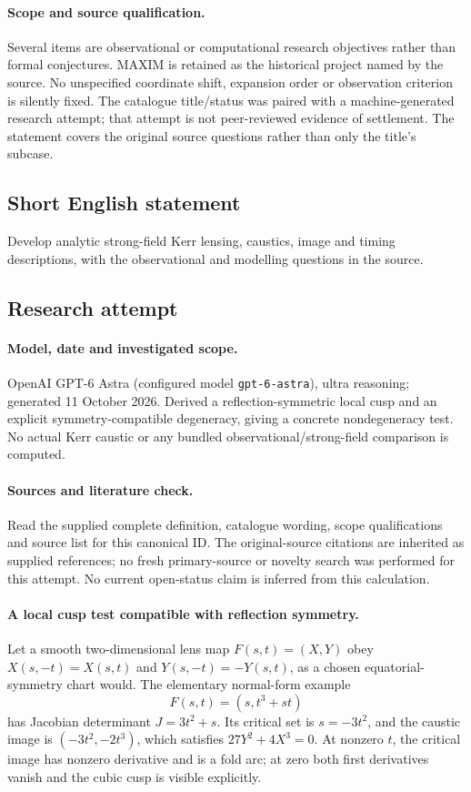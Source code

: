 \documentclass[11pt]{article}
\begin{document}
\paragraph{Scope and source qualification.}Several items are observational or computational research objectives rather than formal conjectures. MAXIM is retained as the historical project named by the source. No unspecified coordinate shift, expansion order or observation criterion is silently fixed. The catalogue title/status was paired with a machine-generated research attempt; that attempt is not peer-reviewed evidence of settlement. The statement covers the original source questions rather than only the title’s subcase.
\subsection{Short English statement}
Develop analytic strong-field Kerr lensing, caustics, image and timing descriptions, with the observational and modelling questions in the source.
\subsection{Research attempt}
\paragraph{Model, date and investigated scope.}
OpenAI GPT-6 Astra (configured model \texttt{gpt-6-astra}), ultra reasoning; generated 11 October 2026. Derived a reflection-symmetric local cusp and an explicit symmetry-compatible degeneracy, giving a concrete nondegeneracy test. No actual Kerr caustic or any bundled observational/strong-field comparison is computed.

\paragraph{Sources and literature check.}
Read the supplied complete definition, catalogue wording, scope qualifications and source list for this canonical ID. The original-source citations are inherited as supplied references; no fresh primary-source or novelty search was performed for this attempt. No current open-status claim is inferred from this calculation.

\paragraph{A local cusp test compatible with reflection symmetry.}Let a smooth two-dimensional lens map \(F(s,t)=(X,Y)\) obey \(X(s,-t)=X(s,t)\) and \(Y(s,-t)=-Y(s,t)\), as a chosen equatorial-symmetry chart would. The elementary normal-form example
\[F(s,t)=(s,t^3+st)
\]
has Jacobian determinant \(J=3t^2+s\). Its critical set is \(s=-3t^2\), and the caustic image is \((-3t^2,-2t^3)\), which satisfies \(27Y^2+4X^3=0\). At nonzero \(t\), the critical image has nonzero derivative and is a fold arc; at zero both first derivatives vanish and the cubic cusp is visible explicitly.
\end{document}
